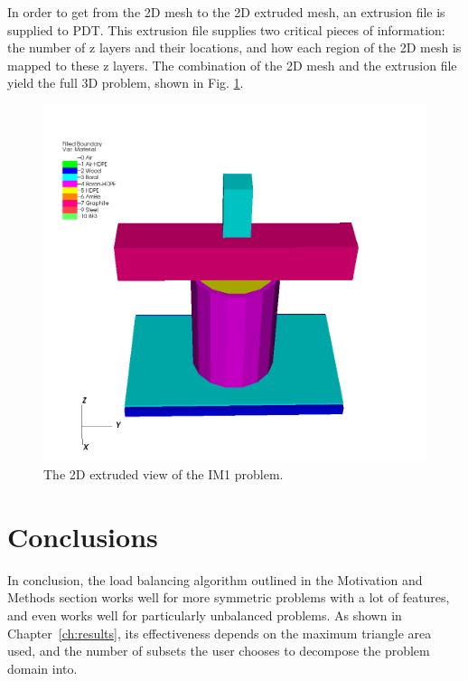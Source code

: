 \documentclass{anstrans}
\begin{document}
In order to get from the 2D mesh to the 2D extruded mesh, an extrusion file is supplied to PDT. This extrusion file supplies two critical pieces of information: the number of z layers and their locations, and how each region of the 2D mesh is mapped to these z layers. The combination of the 2D mesh and the extrusion file yield the full 3D problem, shown in Fig. \ref{IM13D}.

\begin{figure}[H]
\centering
\includegraphics[scale = 0.3]{figures/IM1_3D.png}
\caption{The 2D extruded view of the IM1 problem.}
\label{IM13D}
\end{figure}

\section{Conclusions}

In conclusion, the load balancing algorithm outlined in the Motivation and Methods section works well for more symmetric problems with a lot of features, and even works well for particularly unbalanced problems. As shown in Chapter~\ref{ch:results}, its effectiveness depends on the maximum triangle area used, and the number of subsets the user chooses to decompose the problem domain into. 
\end{document}
